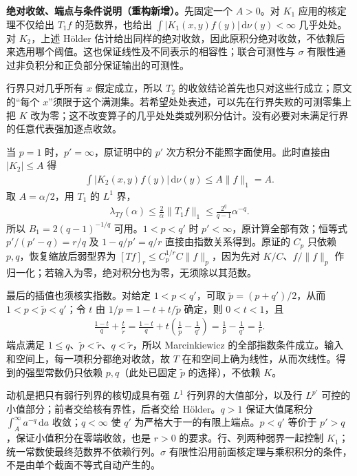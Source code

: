 \documentclass[../../main.tex]{subfiles}
\begin{document}
\begin{remark}
\textbf{绝对收敛、端点与条件说明（重构新增）。}先固定一个 $A>0$。对 $K_1$ 应用的核定理不仅给出 $T_1f$ 的范数界，也给出 $\int|K_1(x,y)f(y)|\,\mathrm d\nu(y)<\infty$ 几乎处处。对 $K_2$，上述 Hölder 估计给出同样的绝对收敛，因此原积分绝对收敛，不依赖后来选用哪个阈值。这也保证线性及不同表示的相容性；联合可测性与 $\sigma$ 有限性通过非负积分和正负部分保证输出的可测性。

行界只对几乎所有 $x$ 假定成立，所以 $T_2$ 的收敛结论首先也只对这些行成立；原文的“每个 $x$”须限于这个满测集。若希望处处表述，可以先在行界失败的可测零集上把 $K$ 改为零；这不改变算子的几乎处处类或列积分估计。没有必要对未满足行界的任意代表强加逐点收敛。

当 $p=1$ 时，$p'=\infty$，原证明中的 $p'$ 次方积分不能照字面使用。此时直接由 $|K_2|\leqslant A$ 得
\begin{align*}
\int|K_2(x,y)f(y)|\,\mathrm d\nu(y)\leqslant A\|f\|_1=A.
\end{align*}
取 $A=\alpha/2$，用 $T_1$ 的 $L^1$ 界，
\begin{align*}
\lambda_{Tf}(\alpha)\leqslant\frac2\alpha\|T_1f\|_1
\leqslant\frac{2^q}{q-1}\alpha^{-q}.
\end{align*}
所以 $B_1=2(q-1)^{-1/q}$ 可用。$1<p<q'$ 时 $p'<\infty$，原计算全部有效；恒等式 $p'/(p'-q)=r/q$ 及 $1-q/p'=q/r$ 直接由指数关系得到。原证的 $C_p$ 只依赖 $p,q$，恢复缩放后弱型界为 $[Tf]_r\leqslant C_p^{1/r}C\|f\|_p$，因为先对 $K/C$、$f/\|f\|_p$ 作归一化；若输入为零，绝对积分也为零，无须除以其范数。

最后的插值也须核实指数。对给定 $1<p<q'$，可取 $\widetilde p=(p+q')/2$，从而 $1< p<\widetilde p<q'$；令 $t$ 由 $1/p=1-t+t/\widetilde p$ 确定，则 $0<t<1$，且
\begin{align*}
\frac{1-t}q+\frac t{\widetilde r}
=\frac{1-t}q+t\left(\frac1{\widetilde p}-\frac1{q'}\right)
=\frac1p-\frac1{q'}=\frac1r.
\end{align*}
端点满足 $1\leqslant q$、$\widetilde p<\widetilde r$、$q<\widetilde r$，所以 Marcinkiewicz 的全部指数条件成立。输入和空间上，每一项积分都绝对收敛，故 $T$ 在和空间上确为线性，从而次线性。得到的强型常数仍只依赖 $p,q$（此处已固定 $\widetilde p$ 的选择），不依赖 $K$。

动机是把只有弱行列界的核切成具有强 $L^1$ 行列界的大值部分，以及行 $L^{p'}$ 可控的小值部分；前者交给核有界性，后者交给 Hölder。$q>1$ 保证大值尾积分 $\int_A^\infty a^{-q}\,\mathrm da$ 收敛；$q<\infty$ 使 $q'$ 为严格大于一的有限上端点。$p<q'$ 等价于 $p'>q$，保证小值积分在零端收敛，也是 $r>0$ 的要求。行、列两种弱界一起控制 $K_1$；统一常数使最终范数界不依赖行列。$\sigma$ 有限性沿用前面核定理与乘积积分的条件，不是由单个截面不等式自动产生的。
\end{remark}
\end{document}
